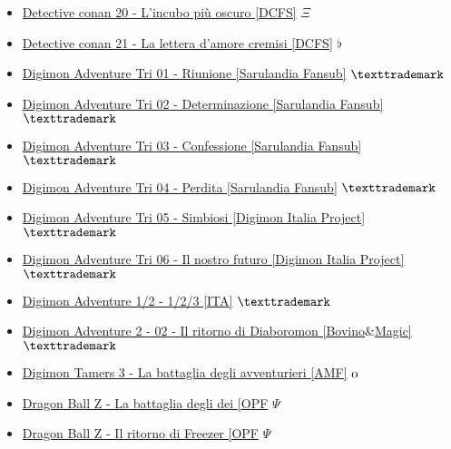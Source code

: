 \begin{itemize}
				\item \href{https://mega.nz/#!kepW3SJA!nRB4fLiXJi2mavoKtaCURyTqR9GORTgAuLxeYjwmPX0} {Detective conan 20 - L'incubo più oscuro [DCFS]}  $\Xi$   \\
				\item \href{https://mega.nz/#!kvJgwKYC!3xXYc52b1Idsrkyg5GRxSslQCr-k7mz4yxHqMMcd3cM} {Detective conan 21 - La lettera d'amore cremisi [DCFS]}  $\flat$   \\
				\item \href{https://mega.nz/#!f7gQVICC!zoVrSvlENhRQCoDLgeHMjZDbJyqZlQnD0O1t96GuxHw} {Digimon Adventure Tri 01 - Riunione [Sarulandia Fansub]}  $\texttrademark$   \\
				\item \href{https://mega.nz/#!32Z0HJKB!nSLjXvw1H5VYncs5I8VEUuhGZjvJ6MlMC7SoFPVkFVI} {Digimon Adventure Tri 02 - Determinazione [Sarulandia Fansub]}  $\texttrademark$   \\
				\item \href{https://mega.nz/#!iqY2EIqA!aJnq93oYPY5aod0rvCfIkLSbLkLoyoFRkkwDr17ht-4} {Digimon Adventure Tri 03 - Confessione [Sarulandia Fansub]}  $\texttrademark$   \\
				\item \href{https://mega.nz/#!Gi4kgbQR!VRoCxkug_tQaT2xR2smG77zndRQTvMZbYSKRfBVIiQc} {Digimon Adventure Tri 04 - Perdita [Sarulandia Fansub]}  $\texttrademark$   \\
				\item \href{https://mega.nz/#!K3oWyR7B!2VkWT1kZMR2rMG9wwzUTRfrZv6YPCRrXXu7AzHl0Ci4} {Digimon Adventure Tri 05 - Simbiosi [Digimon Italia Project]}  $\texttrademark$   \\
				\item \href{https://mega.nz/#!brxiHIZL!F7ld-SdixW03MjWsYM7yx5GVgFDwrID3khPVpvVyDPk} {Digimon Adventure Tri 06 - Il nostro futuro [Digimon Italia Project]}  $\texttrademark$   \\
				\item \href{https://mega.nz/#!eyhgyYzb!XIp7xlCO_OJt3MC0F9_cEHjtbGV3upvfnrNB_B-nP_c} {Digimon Adventure 1/2 - 1/2/3 [ITA]}  $\texttrademark$   \\
				\item \href{https://mega.nz/#!L6QHFDBC!U6pNoVhmMWfSZAI9QaTg7Cty1gVhfyU16daY8nCtWAE} {Digimon Adventure 2 - 02 - Il ritorno di Diaboromon [Bovino$\&$Magic]}  $\texttrademark$   \\
				\item \href{https://mega.nz/#!K3BxiDob!cwaaIjCeao0s9Q7ZrDTIHu4jMxHmfj_CzsTTjh9YoEM} {Digimon Tamers 3 - La battaglia degli avventurieri [AMF]}  $\oldstylenums{0}$   \\
				\item \href{https://mega.nz/#!5LYDjR4I!QZ0Hc1yuSPKKAJt5zikPcaSOUS9OZsrW-evvB31zhZM} {Dragon Ball Z - La battaglia degli dei [OPF}  $\Psi$   \\
				\item \href{https://mega.nz/#!oWxBxIQB!ncRM-eVsBqsepAtlu3KywoAB696bEex9fVAElJM4m5A} {Dragon Ball Z - Il ritorno di Freezer [OPF}  $\Psi$   \\
			
			\end{itemize}
		
